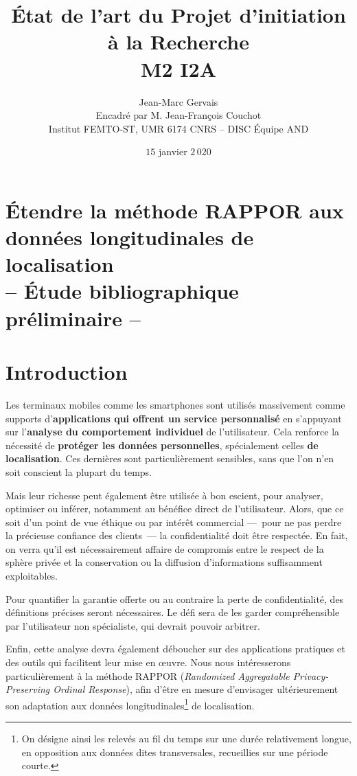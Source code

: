 \documentclass[a4paper,11pt]{article} %
\title{État de l'art du Projet d'initiation à la Recherche\\M2 I2A}
\author{Jean-Marc Gervais\\[0.6em]
Encadré par M. Jean-François Couchot\\
\small Institut FEMTO-ST, UMR 6174 CNRS -- DISC Équipe AND}
\date{$15$ janvier $2\,020$}
\begin{document}
\maketitle
\section*{\center Étendre la méthode RAPPOR aux données longitudinales de localisation\\[1cm]
-- Étude bibliographique préliminaire --}
\thispagestyle{empty}
\newpage
\tableofcontents
\newpage
\section{Introduction}
Les terminaux mobiles comme les smartphones sont utilisés massivement comme supports d'\textbf{applications qui offrent un service personnalisé} en s'appuyant sur l'\textbf{analyse du comportement individuel} de l'utilisateur. 
Cela renforce la nécessité de \textbf{protéger les données personnelles}, spécialement celles \textbf{de localisation}. 
Ces dernières sont particulièrement sensibles, sans que l'on n'en soit conscient la plupart du temps.

Mais leur richesse peut également être utilisée à bon escient, pour analyser, optimiser ou inférer, notamment au bénéfice direct de l'utilisateur. 
Alors, que ce soit d'un point de vue éthique ou par intérêt commercial ---~pour ne pas perdre la précieuse confiance des clients~--- la confidentialité doit être respectée. 
En fait, on verra qu'il est nécessairement affaire de compromis entre le respect de la sphère privée et la conservation ou la diffusion d'informations suffisamment exploitables.

Pour quantifier la garantie offerte ou au contraire la perte de confidentialité, des définitions précises seront nécessaires.
Le défi sera de les garder compréhensible par l'utilisateur non spécialiste, qui devrait pouvoir arbitrer.

Enfin, cette analyse devra également déboucher sur des applications pratiques et des outils qui facilitent leur mise en œuvre. 
Nous nous intéresserons particulièrement à la méthode RAPPOR (\textit{Randomized Aggregatable Privacy-Preserving Ordinal Response}), afin d'être en mesure d'envisager ultérieurement son adaptation aux données longitudinales\footnote{On désigne ainsi les relevés \og au fil du temps\fg{} sur une durée relativement longue, en opposition aux données dites transversales, recueillies sur une période courte.} de localisation.
%
\end{document}
